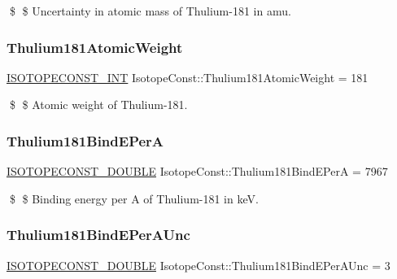 \$ \$ Uncertainty in atomic mass of Thulium-\/181 in amu. \mbox{\label{group___isotope_const-_thulium-_tm181_gadfd812a78c22c8ffd0610e70acfb2f84}} 
\subsubsection{\texorpdfstring{Thulium181\+Atomic\+Weight}{Thulium181AtomicWeight}}
{\footnotesize\ttfamily \mbox{\hyperlink{group___isotope_const-_macros_ga5f18360b3e99483a35c32d789e62621c}{I\+S\+O\+T\+O\+P\+E\+C\+O\+N\+S\+T\+\_\+\+I\+NT}} Isotope\+Const\+::\+Thulium181\+Atomic\+Weight = 181}

\$ \$ Atomic weight of Thulium-\/181. \mbox{\label{group___isotope_const-_thulium-_tm181_ga2b4496f17bcf6f394db40625467d5e71}} 
\subsubsection{\texorpdfstring{Thulium181\+Bind\+E\+PerA}{Thulium181BindEPerA}}
{\footnotesize\ttfamily \mbox{\hyperlink{group___isotope_const-_macros_ga8f45a7272ce02c0b4c65c44636ed719a}{I\+S\+O\+T\+O\+P\+E\+C\+O\+N\+S\+T\+\_\+\+D\+O\+U\+B\+LE}} Isotope\+Const\+::\+Thulium181\+Bind\+E\+PerA = 7967}

\$ \$ Binding energy per A of Thulium-\/181 in keV. \mbox{\label{group___isotope_const-_thulium-_tm181_ga9d9387a9e89137aecd388fc4ff100eac}} 
\subsubsection{\texorpdfstring{Thulium181\+Bind\+E\+Per\+A\+Unc}{Thulium181BindEPerAUnc}}
{\footnotesize\ttfamily \mbox{\hyperlink{group___isotope_const-_macros_ga8f45a7272ce02c0b4c65c44636ed719a}{I\+S\+O\+T\+O\+P\+E\+C\+O\+N\+S\+T\+\_\+\+D\+O\+U\+B\+LE}} Isotope\+Const\+::\+Thulium181\+Bind\+E\+Per\+A\+Unc = 3}

